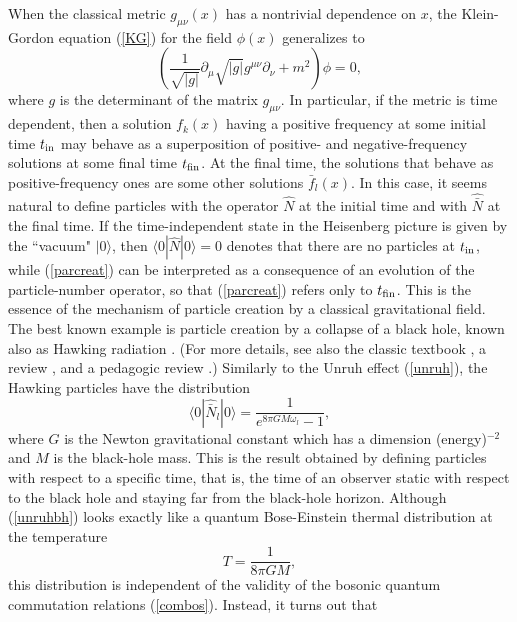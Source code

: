 \documentclass[12pt]{article}
\begin{document}
When the classical metric $g_{\mu\nu}(x)$ has a nontrivial dependence on 
$x$, the Klein-Gordon equation (\ref{KG}) for the field 
$\phi(x)$ generalizes to
\begin{equation}
\left(
\frac{1}{\sqrt{|g|}} \partial_{\mu}\sqrt{|g|} g^{\mu\nu}\partial_{\nu}
+m^2 \right) \phi=0 ,
\end{equation}
where $g$ is the determinant of the matrix $g_{\mu\nu}$.
In particular, if the metric is time dependent, then
a solution $f_k(x)$ having a positive frequency at some initial time
$t_{\rm in}$ may behave as a superposition of positive- and 
negative-frequency solutions at some final time $t_{\rm fin}$. 
At the final time, 
the solutions that behave as positive-frequency ones are some other 
solutions $\bar{f}_l(x)$. In this case, it seems natural 
to define particles with the operator $\hat{N}$ at the initial time 
and with $\hat{\bar{N}}$ at the final time. If the time-independent state
in the Heisenberg picture is given by the ``vacuum" $|0\rangle$, 
then $\langle 0|\hat{N}|0\rangle=0$ denotes that there are no 
particles at $t_{\rm in}$, while
(\ref{parcreat}) can be interpreted as a consequence of an evolution
of the particle-number operator, so that (\ref{parcreat})
refers only to $t_{\rm fin}$. This is the essence of the 
mechanism of particle creation by a classical gravitational 
field. The best known example is particle creation by a
collapse of a black hole, known also as Hawking radiation 
\cite{hawk}. (For more details, see also the classic textbook 
\cite{birdav}, a review \cite{brout}, and a pedagogic review \cite{jacob}.)
Similarly to the Unruh effect (\ref{unruh}), the Hawking particles 
have the distribution 
\begin{equation}\label{unruhbh}
\langle 0|\hat{\bar{N}}_l|0\rangle=\frac{1}{e^{8\pi GM\omega_l}-1},
\end{equation}
where $G$ is the Newton gravitational constant which has a dimension
(energy)$^{-2}$ and $M$ is the black-hole mass.
This is the result obtained by defining particles with respect to
a specific time, that is, the 
time of an observer static with respect to the black hole and staying 
far from the black-hole horizon. 
Although (\ref{unruhbh}) looks exactly like a quantum 
Bose-Einstein thermal distribution at the temperature
\begin{equation}\label{Thawk}
T=\frac{1}{8\pi GM} ,
\end{equation}
this distribution is independent of the validity of the 
bosonic quantum commutation relations (\ref{combos}).
Instead, it turns out that 
\end{document}
